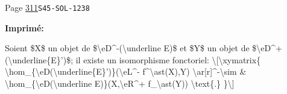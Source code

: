 \documentclass[oneside]{book}
\theoremstyle{sga-source}
\theoremstyle{sga-source-dash}
\theoremstyle{sga-source-dotdash}
\theoremstyle{sga-source-number-note-dash}
\theoremstyle{sga-source-note-number-dotdash}
\theoremstyle{sga-source-example-dotdash}
\theoremstyle{sga-source-inline-number}
\theoremstyle{sga-source-bare-number}
\theoremstyle{sga-source}
\begin{document}
\begin{description}
\smallskip
\item[\hypertarget{apparatus:FR-0311}{311}] Page \hyperlink{printpage:fr:311}{311}\quad\texttt{S45-SOL-1238}
\par\noindent\textbf{Imprimé:} {\footnotesize\ttfamily\raggedright Soient \$X\$ un objet de \$\textbackslash{}\allowbreak{}eD\textasciicircum{}\allowbreak{}-\allowbreak{}(\allowbreak{}\textbackslash{}\allowbreak{}underline E)\allowbreak{}\$ et \$Y\$ un objet de  \$\textbackslash{}\allowbreak{}eD\textasciicircum{}\allowbreak{}+\allowbreak{}(\allowbreak{}\textbackslash{}\allowbreak{}underline\{\allowbreak{}E\}\allowbreak{}')\allowbreak{}\$; il existe un isomorphisme fonctoriel:  \textbackslash{}\allowbreak{}[\allowbreak{}\textbackslash{}\allowbreak{}xymatrix\{\allowbreak{}   \textbackslash{}\allowbreak{}hom\_\allowbreak{}\{\allowbreak{}\textbackslash{}\allowbreak{}eD(\allowbreak{}\textbackslash{}\allowbreak{}underline\{\allowbreak{}E\}\allowbreak{}')\allowbreak{}\}\allowbreak{}(\allowbreak{}\textbackslash{}\allowbreak{}eL\textasciicircum{}\allowbreak{}-\allowbreak{} f\textasciicircum{}\allowbreak{}\textbackslash{}\allowbreak{}ast(\allowbreak{}X)\allowbreak{},\allowbreak{}Y)\allowbreak{} \textbackslash{}\allowbreak{}ar[\allowbreak{}r]\allowbreak{}\textasciicircum{}\allowbreak{}-\allowbreak{}\textbackslash{}\allowbreak{}sim      \& \textbackslash{}\allowbreak{}hom\_\allowbreak{}\{\allowbreak{}\textbackslash{}\allowbreak{}eD(\allowbreak{}\textbackslash{}\allowbreak{}underline E)\allowbreak{}\}\allowbreak{}(\allowbreak{}X,\allowbreak{}\textbackslash{}\allowbreak{}eR\textasciicircum{}\allowbreak{}+\allowbreak{} f\_\allowbreak{}\textbackslash{}\allowbreak{}ast(\allowbreak{}Y)\allowbreak{})\allowbreak{} \textbackslash{}\allowbreak{}text\{\allowbreak{}.\}\allowbreak{} \}\allowbreak{}\textbackslash{}\allowbreak{}]\allowbreak{}\par}

\end{description}
\end{document}
